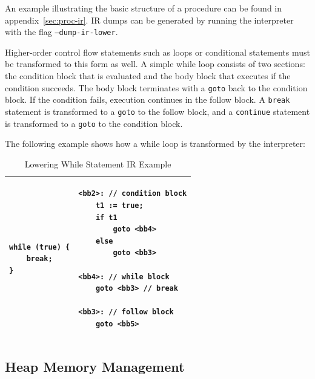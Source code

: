 An example illustrating the basic structure of a procedure can be found in appendix~\ref{sec:proc-ir}. IR dumps can be generated by running the interpreter with the flag \texttt{--dump-ir-lower}.

Higher-order control flow statements such as loops or conditional statements must be transformed to this form as well. A simple while loop consists of two sections: the condition block that is evaluated and the body block that executes if the condition succeeds. The body block terminates with a \texttt{goto} back to the condition block. If the condition fails, execution continues in the follow block. A \texttt{break} statement is transformed to a \texttt{goto} to the follow block, and a \texttt{continue} statement is transformed to a \texttt{goto} to the condition block.

The following example shows how a while loop is transformed by the interpreter:

\begin{table}[H]
	\centering
    \caption{Lowering While Statement IR Example}
	\renewcommand{\arraystretch}{1}
	\begin{tabular}{ |p{7cm}|p{7cm}| }
		\hline
\begin{lstlisting}
while (true) {
    break;
}

\end{lstlisting}
&
\begin{lstlisting}
<bb2>: // condition block
	t1 := true;
	if t1 
		goto <bb4>
	else
		goto <bb3>

<bb4>: // while block
	goto <bb3> // break

<bb3>: // follow block
	goto <bb5>
\end{lstlisting}
\\
		\hline
	\end{tabular}
\end{table}

\subsection{Heap Memory Management}


